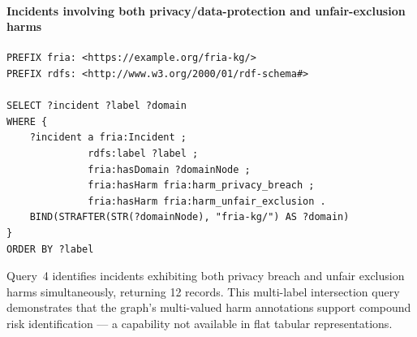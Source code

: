 \paragraph{Incidents involving both privacy/data-protection and unfair-exclusion harms}

\begin{lstlisting}[language=SPARQL,basicstyle=\ttfamily\footnotesize,breaklines=true,caption={Incidents involving both privacy/data-protection and unfair-exclusion harms}]
PREFIX fria: <https://example.org/fria-kg/>
PREFIX rdfs: <http://www.w3.org/2000/01/rdf-schema#>

SELECT ?incident ?label ?domain
WHERE {
    ?incident a fria:Incident ;
              rdfs:label ?label ;
              fria:hasDomain ?domainNode ;
              fria:hasHarm fria:harm_privacy_breach ;
              fria:hasHarm fria:harm_unfair_exclusion .
    BIND(STRAFTER(STR(?domainNode), "fria-kg/") AS ?domain)
}
ORDER BY ?label
\end{lstlisting}

Query~4 identifies incidents exhibiting both privacy breach and unfair exclusion harms simultaneously, returning 12 records. This multi-label intersection query demonstrates that the graph's multi-valued harm annotations support compound risk identification --- a capability not available in flat tabular representations.
